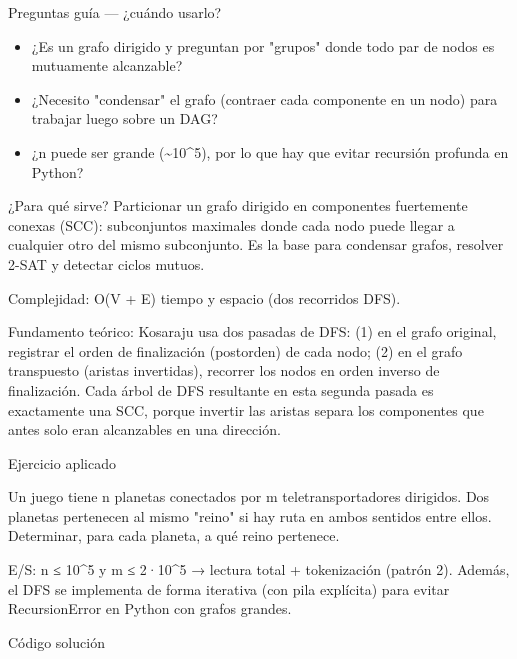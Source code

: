 Preguntas guía — ¿cuándo usarlo?

\begin{itemize}
\item ¿Es un grafo dirigido y preguntan por "grupos" donde todo par de nodos es mutuamente alcanzable?
\item ¿Necesito "condensar" el grafo (contraer cada componente en un nodo) para trabajar luego sobre un DAG?
\item ¿n puede ser grande (\textasciitilde{}10\textasciicircum{}5), por lo que hay que evitar recursión profunda en Python?
\end{itemize}

¿Para qué sirve? Particionar un grafo dirigido en componentes fuertemente conexas (SCC): subconjuntos maximales donde cada nodo puede llegar a cualquier otro del mismo subconjunto. Es la base para condensar grafos, resolver 2-SAT y detectar ciclos mutuos.

Complejidad: O(V + E) tiempo y espacio (dos recorridos DFS).

Fundamento teórico: Kosaraju usa dos pasadas de DFS: (1) en el grafo original, registrar el orden de finalización (postorden) de cada nodo; (2) en el grafo transpuesto (aristas invertidas), recorrer los nodos en orden inverso de finalización. Cada árbol de DFS resultante en esta segunda pasada es exactamente una SCC, porque invertir las aristas separa los componentes que antes solo eran alcanzables en una dirección.

Ejercicio aplicado

Un juego tiene n planetas conectados por m teletransportadores dirigidos. Dos planetas pertenecen al mismo "reino" si hay ruta en ambos sentidos entre ellos. Determinar, para cada planeta, a qué reino pertenece.

E/S: n ≤ 10\textasciicircum{}5 y m ≤ 2·10\textasciicircum{}5 → lectura total + tokenización (patrón 2). Además, el DFS se implementa de forma iterativa (con pila explícita) para evitar RecursionError en Python con grafos grandes.

Código solución

